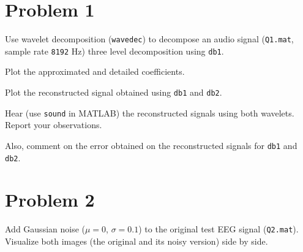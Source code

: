 \maketitle

\section*{Problem 1} \label{sec:problem1}

\begin{tcolorbox}[colback=red!5!white,boxrule=0pt,frame empty]
    Use wavelet decomposition (\verb|wavedec|) to decompose an audio signal (\verb|Q1.mat|, sample rate \verb|8192| Hz)
    three level decomposition using \verb|db1|.
\end{tcolorbox}

\vspace{0.5cm}

\begin{tcolorbox}[colback=red!5!white,colframe=red!75!black,title=Problem 1.a]
    Plot the approximated and detailed coefficients.
\end{tcolorbox}


\begin{tcolorbox}[colback=red!5!white,colframe=red!75!black,title=Problem 1.b]
    Plot the reconstructed signal obtained using \verb|db1| and \verb|db2|.
\end{tcolorbox}

\begin{tcolorbox}[colback=red!5!white,colframe=red!75!black,title=Problem 1.c]
    Hear (use \verb|sound| in MATLAB) the reconstructed signals using both wavelets.
    Report your observations.
\end{tcolorbox}

\begin{tcolorbox}[colback=red!5!white,colframe=red!75!black,title=Problem 1.d]
    Also, comment on the error obtained on the reconstructed signals for \verb|db1| and \verb|db2|.
\end{tcolorbox}



\section*{Problem 2} \label{sec:problem2}

\begin{tcolorbox}[colback=green!5!white,boxrule=0pt,frame empty]
    Add Gaussian noise ($\mu = 0$, $\sigma = 0.1$) to the original test
    EEG signal (\verb|Q2.mat|).
    Visualize both images (the original and its noisy version) side by side.
\end{tcolorbox}

